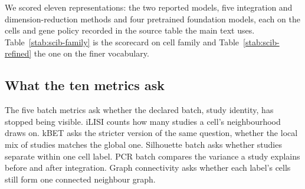 We scored eleven representations: the two reported \elaj{} models, five
integration and dimension-reduction methods and four pretrained foundation
models, each on the cells and gene policy recorded in the source table the
main text uses. Table~\ref{stab:scib-family} is the scorecard on cell family 
and Table~\ref{stab:scib-refined} the one on the finer vocabulary.

\begin{table}[p]
\centering
\caption[scIB scorecard, cell family]{\textbf{The scIB scorecard on cell
family.} Eleven representations, ten metrics, 176{,}803 held-out cells
from the two studies that annotated their cells; batch is study. The five
columns on the left are scIB's batch-correction half and the five on the
right its biological-conservation half. Every metric is scaled so that one
is best. The comparison representations are Harmony
\citep{korsunsky2019harmony}, Scanorama \citep{hie2019scanorama}, scVI
\citep{lopez2018scvi}, scANVI \citep{xu2021scanvi}, scGPT \citep{cui2024scgpt},
Geneformer \citep{theodoris2023geneformer}, SCimilarity
\citep{heimberg2025scimilarity} and scFoundation \citep{hao2024scfoundation}.}
\label{stab:scib-family}
\footnotesize\setlength{\tabcolsep}{3pt}
\resizebox{\textwidth}{!}{}
\end{table}

\begin{table}[p]
\centering
\caption[scIB scorecard, refined annotation]{\textbf{The scIB scorecard on
the sixty-level annotation.} The seven metrics that are defined when the
label comes from a single study, over 132{,}261 held-out cells carrying
\texttt{duempelmann\_2026}'s \citep{duempelmann2026endometrium} \texttt{AnnotationRefined}. PCR batch is one
for every representation because there is one study, so the variance
explained by study is zero before and after.}
\label{stab:scib-refined}
\small

\end{table}

\subsection{What the ten metrics ask}

The five batch metrics ask whether the declared batch, study identity, has
stopped being visible. iLISI \citep{korsunsky2019harmony} counts how many studies a cell's
neighbourhood draws on. kBET \citep{buttner2019kbet} asks the stricter version of the same
question, whether the local mix of studies matches the global one.
Silhouette batch \citep{rousseeuw1987silhouettes} asks whether studies separate within one cell label. PCR
batch compares the variance a study explains before and after integration.
Graph connectivity asks whether each label's cells still form one connected
neighbour graph.

